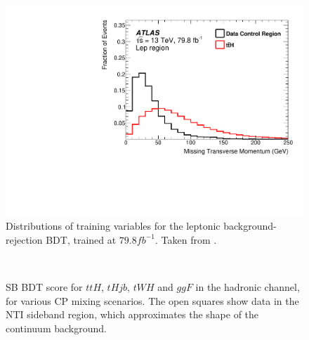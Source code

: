 \begin{figure}
	\includegraphics[width=0.31\linewidth]{figures/tthcp_chapter/figaux_11g.pdf}
	\caption{Distributions of training variables for the leptonic background-rejection BDT, trained at $79.8 fb^{-1}$. Taken from \cite{ttH}.}
	\label{fig:SBBDTvarslep}
\end{figure}

\iffalse
\begin{figure}[htbp]
  \centering
         \\
  \caption{SB BDT score for $ttH$, $tHjb$, $tWH$ and $ggF$ in the hadronic channel, for various CP mixing scenarios. The open squares show data in the NTI sideband region, which approximates the shape of the continuum background.  }
  \label{fig:moriondhad}
\end{figure}


